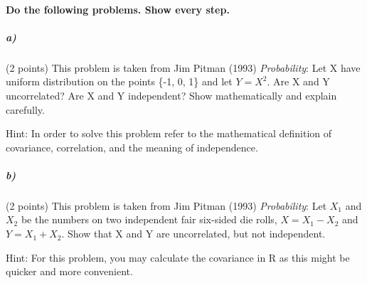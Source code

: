 \documentclass[12pt,letter]{article}
\begin{document}
\paragraph{Do the following problems. Show every step.}

\subparagraph{a)} (2 points) This problem is taken from Jim Pitman (1993) \textit{Probability}: Let X have uniform distribution on the points \big\{-1, 0, 1\big\} and let $Y=X^2$. Are X and Y uncorrelated? Are X and Y independent? Show mathematically and explain carefully. %

Hint: In order to solve this problem refer to the mathematical definition of covariance, correlation, and the meaning of independence.

\subparagraph{b)} (2 points) This problem is taken from Jim Pitman (1993) \textit{Probability}: Let $X_{1}$ and $X_{2} $ be the numbers on two independent fair six-sided die rolls, $X = X_{1} - X_{2}$ and $Y= X_{1} + X_{2}$. Show that X and Y are uncorrelated, but not independent. %

Hint: For this problem, you may calculate the covariance in R as this might be quicker and more convenient.
\end{document}
